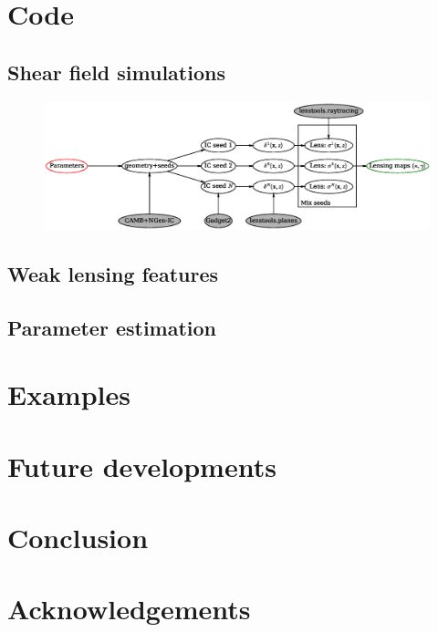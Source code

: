 \documentclass[reprint,aps,prd,superscriptaddress,showkeys,showpacs]{revtex4-1}
\begin{document}

\section{Code} 

\subsection{Shear field simulations}

\begin{figure}
\includegraphics[scale=0.6]{Figures/flow.eps}
\end{figure}



\subsection{Weak lensing features}

\subsection{Parameter estimation}


\section{Examples}


\section{Future developments}


\section{Conclusion}

 

\section*{Acknowledgements}



\label{lastpage}
\end{document}
